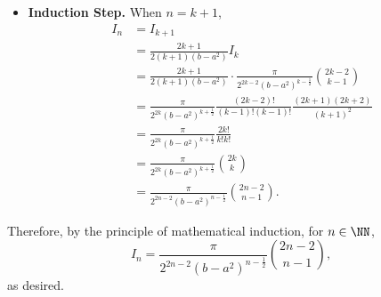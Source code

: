 \begin{enumerate}
\begin{itemize}
        \item \textbf{Induction Step.} When \(n = k + 1\),
        \begin{align*}
            I_n &= I_{k + 1}\\
            &= \frac{2k + 1}{2(k + 1)(b - a^2)} I_k\\
            &= \frac{2k + 1}{2(k + 1)(b - a^2)} \cdot \frac{\pi}{2^{2k - 2} (b - a^2)^{k - \frac{1}{2}}} \binom{2k - 2}{k - 1}\\
            &= \frac{\pi}{2^{2k} (b - a^2)^{k + \frac{1}{2}}} \frac{(2k-2)!}{(k-1)!(k-1)!} \frac{(2k + 1)(2k + 2)}{(k + 1)^2}\\
            &= \frac{\pi}{2^{2k} (b - a^2)^{k + \frac{1}{2}}} \frac{2k!}{k!k!}\\
            &= \frac{\pi}{2^{2k} (b - a^2)^{k + \frac{1}{2}}} \binom{2k}{k}\\
            &= \frac{\pi}{2^{2n - 2} (b - a^2)^{n - \frac{1}{2}}} \binom{2n - 2}{n - 1}.
        \end{align*}
    \end{itemize}

    Therefore, by the principle of mathematical induction, for \(n \in \NN\),
    \[
        I_n = \frac{\pi}{2^{2n - 2} (b - a^2)^{n - \frac{1}{2}}} \binom{2n - 2}{n - 1},
    \]
    as desired.
\end{enumerate}